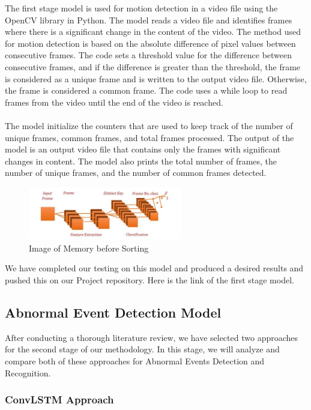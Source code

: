 \documentclass[title page]{article}
\begin{document}
The first stage model is used for motion detection in a video file using the OpenCV library in Python. The model reads a video file and identifies frames where there is a significant change in the content of the video. The method used for motion detection is based on the absolute difference of pixel values between consecutive frames. The code sets a threshold value for the difference between consecutive frames, and if the difference is greater than the threshold, the frame is considered as a unique frame and is written to the output video file. Otherwise, the frame is considered a common frame. The code uses a while loop to read frames from the video until the end of the video is reached. 
\\ \\
The model initialize the counters that are used to keep track of the number of unique frames, common frames, and total frames processed. The output of the model is an output video file that contains only the frames with significant changes in content. The model also prints the total number of frames, the number of unique frames, and the number of common frames detected.

\begin{figure}[h]
    \centering
    \includegraphics[width=0.6\textwidth]{Picture1.jpg}
    \caption{Image of Memory before Sorting}
    \label{fig:1t}
\end{figure}

We have completed our testing on this model and produced a desired results and pushed this on our Project repository. Here is the link of the first stage model.

\subsection{Abnormal Event Detection Model}

After conducting a thorough literature review, we have selected two approaches for the second stage of our methodology. In this stage, we will analyze and compare both of these approaches for Abnormal Events Detection and Recognition.

\subsubsection{ConvLSTM Approach}
\end{document}
